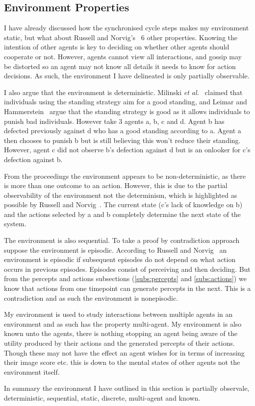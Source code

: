 \documentclass[]{final_report}
\begin{document}
\subsection{Environment Properties}
\label{appendix:envprop}
I have already discussed how the synchronised cycle steps makes my environment static, but what about Russell and Norvig's~\cite{russell2016artificial} 6 other properties. Knowing the intention of other agents is key to deciding on whether other agents should cooperate or not. However, agents cannot view all interactions, and gossip may be distorted so an agent may not know all details it needs to know for action decisions. As such, the environment I have delineated is only partially observable.\par
I also argue that the environment is deterministic. Milinski \textit{et al.}~\cite{imagevsstanding} claimed that individuals using the standing strategy aim for a good standing, and Leimar and Hammerstein~\cite{leimarhammer} argue that the standing strategy is good as it allows individuals to punish bad individuals. However take 3 agents a, b, c and d. Agent b has defected previously against d who has a good standing according to a. Agent a then chooses to punish b but is still believing this won't reduce their standing. However, agent c did not observe b's defection against d but is an onlooker for c's defection against b.\par
From the proceedings the environment appears to be non-deterministic, as there is more than one outcome to an action. However, this is due to the partial observability of the environment not the determinism, which is highlighted as possible by Russell and Norvig~\cite{russell2016artificial}. The current state (c's lack of knowledge on b) and the actions selected by a and b completely determine the next state of the system.\par
The environment is also sequential. To take a proof by contradiction approach suppose the environment is episodic. According to Russell and Norvig~\cite{russell2016artificial} an environment is episodic if subsequent episodes do not depend on what action occurs in previous episodes. Episodes consist of perceiving and then deciding. But from the percepts and actions subsections (\ref{subs:percepts} and \ref{subs:actions}) we know that actions from one timepoint can generate percepts in the next. This is a contradiction and as such the environment is nonepisodic.\par
My environment is used to study interactions between multiple agents in an environment and as such has the property multi-agent. My environment is also known unto the agents, there is nothing stopping an agent being aware of the utility produced by their actions and the generated percepts of their actions. Though these may not have the effect an agent wishes for in terms of increasing their image score etc. this is down to the mental states of other agents not the environment itself.\par 
In summary the environment I have outlined in this section is partially observale, deterministic, sequential, static, discrete, multi-agent and known.
\end{document}
